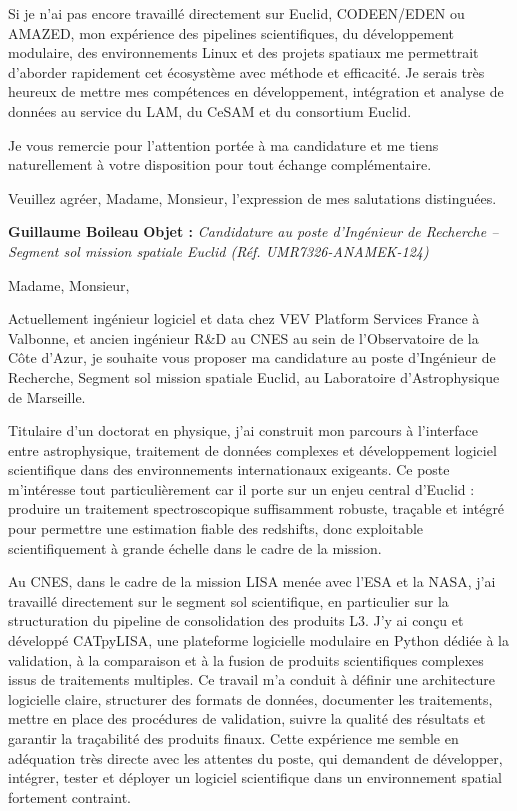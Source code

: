 \documentclass[11pt,a4paper]{altacv}
\begin{document}
{Si je n’ai pas encore travaillé directement sur Euclid, CODEEN/EDEN ou AMAZED, mon expérience des pipelines scientifiques, du développement modulaire, des environnements Linux et des projets spatiaux me permettrait d’aborder rapidement cet écosystème avec méthode et efficacité. Je serais très heureux de mettre mes compétences en développement, intégration et analyse de données au service du LAM, du CeSAM et du consortium Euclid.

Je vous remercie pour l’attention portée à ma candidature et me tiens naturellement à votre disposition pour tout échange complémentaire.

Veuillez agréer, Madame, Monsieur, l’expression de mes salutations distinguées.

\textbf{Guillaume Boileau} 
{\color{accent}\textbf{Objet :}} \textit{Candidature au poste d'Ingénieur de Recherche -- Segment sol mission spatiale Euclid (Réf. UMR7326-ANAMEK-124)}

{\color{body}

Madame, Monsieur,

Actuellement ingénieur logiciel et data chez VEV Platform Services France à Valbonne, et ancien ingénieur R\&D au CNES au sein de l'Observatoire de la Côte d'Azur, je souhaite vous proposer ma candidature au poste d'Ingénieur de Recherche, Segment sol mission spatiale Euclid, au Laboratoire d'Astrophysique de Marseille.

Titulaire d'un doctorat en physique, j'ai construit mon parcours à l'interface entre astrophysique, traitement de données complexes et développement logiciel scientifique dans des environnements internationaux exigeants. Ce poste m'intéresse tout particulièrement car il porte sur un enjeu central d'Euclid : produire un traitement spectroscopique suffisamment robuste, traçable et intégré pour permettre une estimation fiable des redshifts, donc exploitable scientifiquement à grande échelle dans le cadre de la mission.

Au CNES, dans le cadre de la mission LISA menée avec l'ESA et la NASA, j'ai travaillé directement sur le segment sol scientifique, en particulier sur la structuration du pipeline de consolidation des produits L3. J'y ai conçu et développé CATpyLISA, une plateforme logicielle modulaire en Python dédiée à la validation, à la comparaison et à la fusion de produits scientifiques complexes issus de traitements multiples. Ce travail m'a conduit à définir une architecture logicielle claire, structurer des formats de données, documenter les traitements, mettre en place des procédures de validation, suivre la qualité des résultats et garantir la traçabilité des produits finaux. Cette expérience me semble en adéquation très directe avec les attentes du poste, qui demandent de développer, intégrer, tester et déployer un logiciel scientifique dans un environnement spatial fortement contraint.

}}
\end{document}
